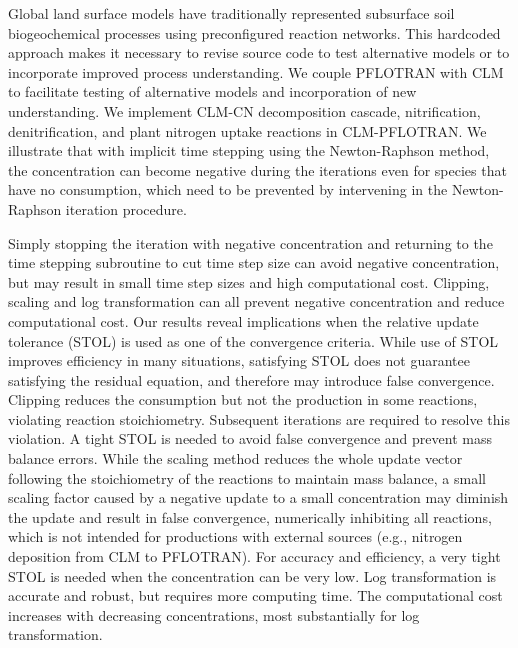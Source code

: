 \documentclass[gmd, manuscript]{copernicus}
\begin{document}
%
Global land surface models have traditionally represented subsurface soil
biogeochemical processes using preconfigured reaction networks. This hardcoded
approach makes it necessary to revise source code to test alternative models or
to incorporate improved process understanding. We couple PFLOTRAN with CLM to
facilitate testing of alternative models and incorporation of new
understanding. We implement CLM-CN decomposition cascade, nitrification,
denitrification, and plant nitrogen uptake reactions in CLM-PFLOTRAN. We
illustrate that with implicit time stepping using the Newton-Raphson method, 
the concentration can become
negative during the iterations even for species that have no consumption, which
need to be prevented by intervening in the Newton-Raphson iteration procedure. 

Simply stopping the iteration with negative concentration and returning to the
time stepping subroutine to cut time step size can avoid negative
concentration, but may result in small time step sizes and high computational
cost. Clipping, scaling  and log transformation can all prevent negative
concentration and reduce computational cost. Our results reveal implications
when the relative update tolerance (STOL) is used as one of the convergence criteria. 
While use of STOL improves efficiency in many situations, satisfying STOL does
not guarantee satisfying the residual equation, and therefore may introduce
false convergence. Clipping reduces the consumption but not the production in
some reactions, violating reaction stoichiometry. Subsequent iterations are
required to resolve this violation. A tight STOL is needed to avoid false
convergence and prevent mass balance errors. While the scaling method reduces
the whole update vector following the stoichiometry of the reactions to maintain  
mass balance, a small scaling factor caused by a negative update to a small
concentration may diminish the update and result in false convergence,
numerically inhibiting all reactions, which is not intended for productions
with external sources (e.g., nitrogen deposition from CLM to PFLOTRAN). For
accuracy and efficiency, a very tight STOL is needed when the concentration can
be very low. Log transformation is accurate and robust, but requires more
computing time. The computational cost increases with decreasing
concentrations, most substantially for log transformation.
\end{document}
